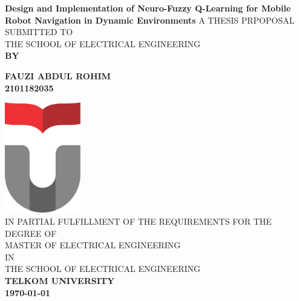 \begin{titlepage}
\begin{center}
	\LARGE %
    {\sf\singlespacing 
		\textbf{ Design and Implementation of Neuro-Fuzzy Q-Learning  for  Mobile Robot Navigation in Dynamic Environments}
	}
    \vfill
	\vfill
    \large
    { 
    	A THESIS PRPOPOSAL SUBMITTED TO\\[0.2cm]
    	THE SCHOOL OF ELECTRICAL ENGINEERING\\     
    }
	\vfill
    \sf\textbf{BY\\[0.5cm]}\par
    \large
    \textbf{FAUZI ABDUL ROHIM\\[0.5cm]2101182035}\par
    \vfill
    \includegraphics[width=0.25\textwidth]{logo/TelkomUniversity}\\[1.5cm] 
    \vfill 
    \normalfont\large
    { 
		IN PARTIAL FULFILLMENT OF THE REQUIREMENTS FOR THE DEGREE OF\\
        MASTER OF ELECTRICAL ENGINEERING\\
        IN\\
        THE SCHOOL OF ELECTRICAL ENGINEERING\\
    }    
    \vfill
    \Large
	\sf\textbf{TELKOM UNIVERSITY}\\
	\sf\textbf{\myyear \today}
\end{center}
\end{titlepage}

